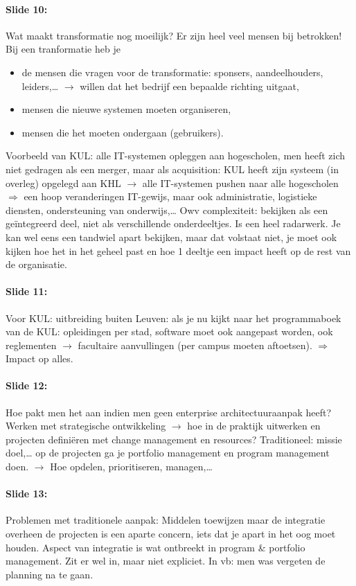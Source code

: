 \documentclass[10pt,a4paper]{report}
\begin{document}
\paragraph{Slide 10:}Wat maakt transformatie nog moeilijk? Er zijn heel veel mensen bij betrokken! Bij een tranformatie heb je
\begin{itemize}
\item de mensen die vragen voor de transformatie: sponsers, aandeelhouders, leiders,…  $\rightarrow$ willen dat het bedrijf een bepaalde richting uitgaat,
\item mensen die nieuwe systemen moeten organiseren,
\item mensen die het moeten ondergaan (gebruikers).
\end{itemize}
Voorbeeld van KUL: alle IT-systemen opleggen aan hogescholen, men heeft zich niet gedragen als een merger, maar als acquisition: KUL heeft zijn systeem (in overleg) opgelegd aan KHL $\rightarrow$ alle IT-systemen pushen naar alle hogescholen $\Rightarrow$ een hoop veranderingen IT-gewijs, maar ook administratie, logistieke diensten, ondersteuning van onderwijs,…
Owv complexiteit: bekijken als een geïntegreerd deel, niet als verschillende onderdeeltjes. Is een heel radarwerk. Je kan wel eens een tandwiel apart bekijken, maar dat volstaat niet, je moet ook kijken hoe het in het geheel past en hoe 1 deeltje een impact heeft op de rest van de organisatie.

\paragraph{Slide 11:}Voor KUL: uitbreiding buiten Leuven: als je nu kijkt naar het programmaboek van de KUL: opleidingen per stad, software moet ook aangepast worden, ook reglementen $\rightarrow$ facultaire aanvullingen (per campus moeten aftoetsen). $\Rightarrow$ Impact op alles.

\paragraph{Slide 12:}Hoe pakt men het aan indien men geen enterprise architectuuraanpak heeft? Werken met strategische ontwikkeling $\rightarrow$ hoe in de praktijk uitwerken en projecten definiëren met change management en resources? Traditioneel: missie doel,… op de projecten ga je portfolio management en program management doen. $\rightarrow$ Hoe opdelen, prioritiseren, managen,\ldots

\paragraph{Slide 13:}Problemen met traditionele aanpak:
Middelen toewijzen maar de integratie overheen de projecten is een aparte concern, iets dat je apart in het oog moet houden. Aspect van integratie is wat ontbreekt in program \& portfolio management. Zit er wel in, maar niet expliciet. In vb: men was vergeten de planning na te gaan.
\end{document}

